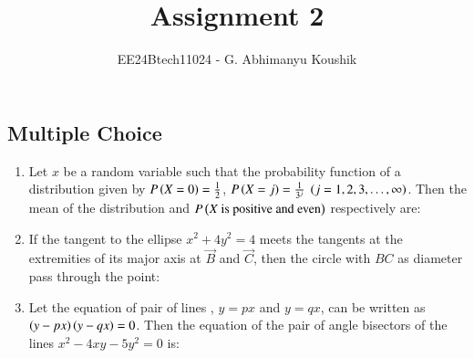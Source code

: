 \documentclass[journal,12pt,onecolumn]{IEEEtran}
\theoremstyle{remark}
\begin{document}
\title{Assignment 2}
\author{EE24Btech11024 - G. Abhimanyu Koushik}
\maketitle
\renewcommand{\thefigure}{\theenumi}
\renewcommand{\thetable}{\theenumi}
\subsection{Multiple Choice}
\begin{enumerate}

\item Let $x$ be a random variable such that the probability function of a distribution given by $P\left(X=0\right)=\frac{1}{2}$, $P\left(X=j\right)=\frac{1}{3^j}$ $\left(j=1,2,3,\dots,\infty\right)$. Then the mean of the distribution and $P\left(X\text{ is positive and even}\right)$ respectively are:

\hfill{}
\begin{enumerate}
\end{enumerate}

\item If the tangent to the ellipse $x^2+4y^2=4$ meets the tangents at the extremities of its major axis at $\vec{B}$ and $\vec{C}$, then the circle with $BC$ as diameter pass through the point:

\hfill{}
\begin{enumerate}
\end{enumerate}

\item Let the equation of pair of lines , $y=px$ and $y=qx$, can be written as $\left(y-px\right)\left(y-qx\right)=0$. Then the equation of the pair of angle bisectors of the lines $x^2-4xy-5y^2=0$ is:


\end{enumerate}
\end{document}
